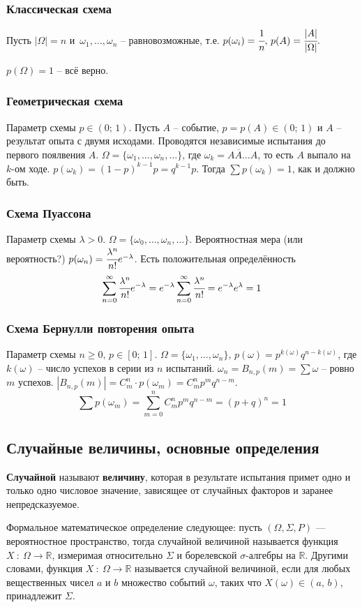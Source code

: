 \documentclass{article}
\newcommand{\R}{\mathbb{R}}
\begin{document}
\subsubsection{Классическая схема}
Пусть $|\Omega|=n$ и $\,\omega_1,\dots,\omega_n$ -- равновозможные, т.е. $p(\omega_i)=\cfrac{1}{n},\,p(A)=\cfrac{|A|}{|\Omega|}.$ 

$p(\Omega)=1$ -- всё верно.
\subsubsection{Геометрическая схема}
Параметр схемы $p\in(0;\,1)$. Пусть $A$ -- событие, $p=p(A)\in(0;\,1)$ и $A$ -- результат опыта с двумя исходами. Проводятся независимые испытания до первого поялвения $A$. $\Omega=\{\omega_1,\dots,\omega_n,\dots\}$, где $\omega_k=\overline{AA\dots}A$, то есть $A$ выпало на $k$-ом ходе. $p(\omega_k)=(1-p)^{k-1}p=q^{k-1}p$. Тогда $\sum p(\omega_k)=1$, как и должно быть.
\subsubsection{Схема Пуассона}
Параметр схемы $\lambda>0$. $\Omega=\{\omega_0,\dots,\omega_n,\dots\}$. Вероятностная мера (или вероятность?) $p(\omega_n)=\cfrac{\lambda^n}{n!}e^{-\lambda}$. Есть положительная определённость $$ \sum_{n=0}^{\infty}\cfrac{\lambda^n}{n!}e^{-\lambda}=e^{-\lambda}\sum_{n=0}^{\infty}\cfrac{\lambda^n}{n!}=e^{-\lambda}e^{\lambda}=1 $$

\subsubsection{Схема Бернулли повторения опыта}
Параметр схемы $n\geq0,\,p\in[0;\,1]$. $\Omega=\{\omega_1,\dots,\omega_n\},\,p(\omega)=p^{k(\omega)}q^{n-k(\omega)}$, где $k(\omega)$ -- число успехов в серии из $n$ испытаний. $\omega_n=B_{n,p}(m)=\sum\omega$ -- ровно $m$ успехов. $|B_{n,p}(m)|=C^n_m\cdot p(\omega_m)=C^n_m p^m q^{n-m}.$
$$ \sum p(\omega_m)=\sum_{m=0}^n C^n_m p^m q^{n-m}=(p+q)^n=1 $$
\subsection{Случайные величины, основные определения}
\textbf{Случайной} называют \textbf{величину}, которая в результате испытания примет одно и только одно числовое значение, зависящее от случайных факторов и заранее непредсказуемое.

Формальное математическое определение следующее: пусть $(\Omega,\Sigma,P)$ — вероятностное пространство, тогда случайной величиной называется функция $X\::\:\Omega\to\R$, измеримая относительно $\Sigma$ и борелевской $\sigma$-алгебры на $\R$. Другими словами, функция $X\::\:\Omega\to\R$ называется случайной величиной, если для любых вещественных чисел $a$ и $b$ множество событий $\omega$, таких что $X(\omega)\in(a,\,b)$, принадлежит $\Sigma$.
\end{document}
